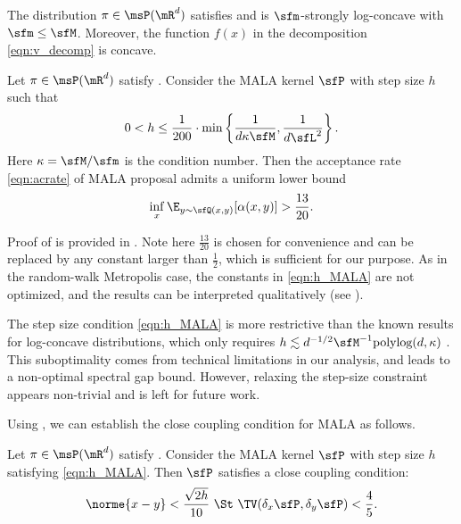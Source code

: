 \documentclass[11pt]{article}
\begin{document}
\begin{asm}
\label{asm:MALA}
The distribution $\pi \in\msP(\mR^d)$ satisfies  and is $\sfm$-strongly log-concave with $\sfm \le \sfM$.
Moreover, the function $f(x)$ in the decomposition \eqref{eqn:v_decomp} is concave.
\end{asm}

\begin{lem}
\label{lem:ac_MALA}
Let $\pi\in\msP(\mR^d)$ satisfy .
%
Consider the MALA kernel $\sfP$ with step size $h$ such that
\begin{equation}
\label{eqn:h_MALA}
    0 < h \le \frac{1}{200} \cdot \min \left\{ \frac{1}{d\kappa \sfM} , \frac{1}{d\sfL^2} \right\}. 
\end{equation}
Here $\kappa = \sfM/\sfm$ is the condition number.
Then the acceptance rate \eqref{eqn:acrate} of MALA proposal admits a uniform lower bound
\begin{equation}
    \inf_x \E_{y \sim \sfQ(x,y)} [\alpha(x,y)] > \frac{13}{20}.
\end{equation}
\end{lem}

Proof of  is provided in .
%
Note here $\frac{13}{20}$ is chosen for convenience and can be replaced by any constant larger than $\frac{1}{2}$, which is sufficient for our purpose.
As in the random-walk Metropolis case, the constants in \eqref{eqn:h_MALA} are not optimized, and the results can be interpreted qualitatively (see ).

\begin{rem}
The step size condition \eqref{eqn:h_MALA} is more restrictive than the known results for log-concave distributions, which only requires \( h \lesssim d^{-1/2} \sfM^{-1} \text{polylog}(d,\kappa) \) \citep{JMLR:v23:21-1184}.
%
This suboptimality comes from technical limitations in our analysis, and leads to a non-optimal spectral gap bound.
However, relaxing the step-size constraint appears non-trivial and is left for future work.
\end{rem}




Using , we can establish the close coupling condition for MALA as follows.
%
\begin{lem}
\label{lem:CloseCoupleMALA}
Let $\pi \in \msP(\mR^d)$ satisfy .
Consider the MALA kernel $\sfP$ with step size $h$ satisfying \eqref{eqn:h_MALA}.
%
Then $\sfP$ satisfies a close coupling condition:
\begin{equation}
\label{eqn:CloseCoupleMALA}
    \norme{x-y} < \frac{\sqrt{2h}}{10} ~\St~ \TV(\delta_x \sfP,\delta_y \sfP) < \frac{4}{5}.
\end{equation}
\end{lem}
\end{document}
